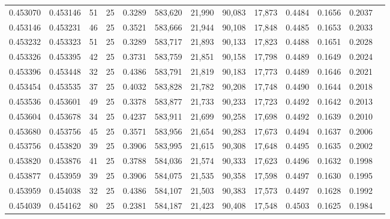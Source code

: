 \begin{tabular}{rrrrrrrrrrrrr}
0.453070 & 0.453146 &    51 &  25 &                                     0.3289 & 583,620 &  21,990 &  90,083 &  17,873 & 0.4484 & 0.1656 & 0.2037 \\
0.453146 & 0.453231 &    46 &  25 &                                     0.3521 & 583,666 &  21,944 &  90,108 &  17,848 & 0.4485 & 0.1653 & 0.2033 \\
0.453232 & 0.453323 &    51 &  25 &                                     0.3289 & 583,717 &  21,893 &  90,133 &  17,823 & 0.4488 & 0.1651 & 0.2028 \\
0.453326 & 0.453395 &    42 &  25 &                                     0.3731 & 583,759 &  21,851 &  90,158 &  17,798 & 0.4489 & 0.1649 & 0.2024 \\
0.453396 & 0.453448 &    32 &  25 &                                     0.4386 & 583,791 &  21,819 &  90,183 &  17,773 & 0.4489 & 0.1646 & 0.2021 \\
0.453454 & 0.453535 &    37 &  25 &                                     0.4032 & 583,828 &  21,782 &  90,208 &  17,748 & 0.4490 & 0.1644 & 0.2018 \\
0.453536 & 0.453601 &    49 &  25 &                                     0.3378 & 583,877 &  21,733 &  90,233 &  17,723 & 0.4492 & 0.1642 & 0.2013 \\
0.453604 & 0.453678 &    34 &  25 &                                     0.4237 & 583,911 &  21,699 &  90,258 &  17,698 & 0.4492 & 0.1639 & 0.2010 \\
0.453680 & 0.453756 &    45 &  25 &                                     0.3571 & 583,956 &  21,654 &  90,283 &  17,673 & 0.4494 & 0.1637 & 0.2006 \\
0.453756 & 0.453820 &    39 &  25 &                                     0.3906 & 583,995 &  21,615 &  90,308 &  17,648 & 0.4495 & 0.1635 & 0.2002 \\
0.453820 & 0.453876 &    41 &  25 &                                     0.3788 & 584,036 &  21,574 &  90,333 &  17,623 & 0.4496 & 0.1632 & 0.1998 \\
0.453877 & 0.453959 &    39 &  25 &                                     0.3906 & 584,075 &  21,535 &  90,358 &  17,598 & 0.4497 & 0.1630 & 0.1995 \\
0.453959 & 0.454038 &    32 &  25 &                                     0.4386 & 584,107 &  21,503 &  90,383 &  17,573 & 0.4497 & 0.1628 & 0.1992 \\
0.454039 & 0.454162 &    80 &  25 &                                     0.2381 & 584,187 &  21,423 &  90,408 &  17,548 & 0.4503 & 0.1625 & 0.1984 \\

\end{tabular}
